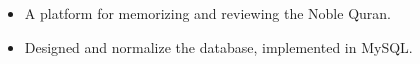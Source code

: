 
\begin{itemize}
    \item A platform for memorizing and reviewing the Noble Quran.
    \item Designed and normalize the database, implemented in MySQL.
\end{itemize}